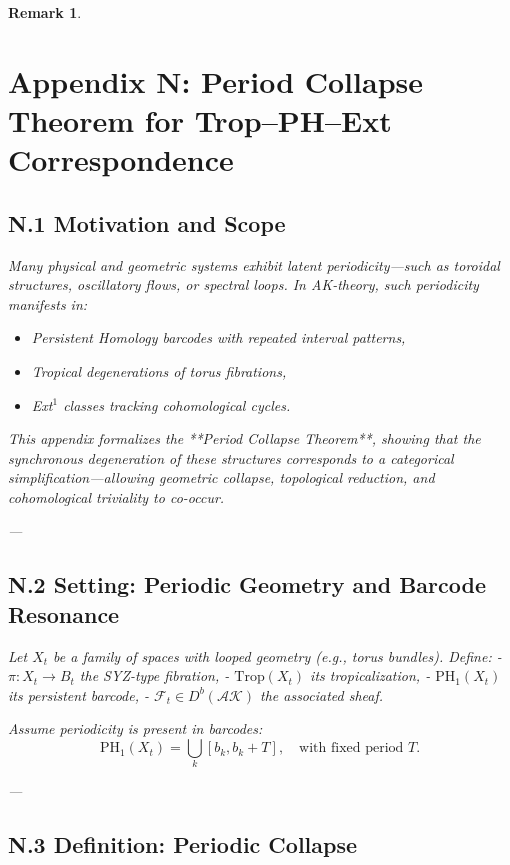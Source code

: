\documentclass[11pt]{article}
\newtheorem{remark}[theorem]{Remark}
\begin{document}
\begin{remark}


\section*{Appendix N: Period Collapse Theorem for Trop–PH–Ext Correspondence}

\subsection*{N.1 Motivation and Scope}

Many physical and geometric systems exhibit latent periodicity—such as toroidal structures, oscillatory flows, or spectral loops. In AK-theory, such periodicity manifests in:
\begin{itemize}
  \item Persistent Homology barcodes with repeated interval patterns,
  \item Tropical degenerations of torus fibrations,
  \item Ext$^1$ classes tracking cohomological cycles.
\end{itemize}

This appendix formalizes the **Period Collapse Theorem**, showing that the synchronous degeneration of these structures corresponds to a categorical simplification—allowing geometric collapse, topological reduction, and cohomological triviality to co-occur.

---

\subsection*{N.2 Setting: Periodic Geometry and Barcode Resonance}

Let $X_t$ be a family of spaces with looped geometry (e.g., torus bundles). Define:
- $\pi: X_t \to B_t$ the SYZ-type fibration,
- $\mathrm{Trop}(X_t)$ its tropicalization,
- $\mathrm{PH}_1(X_t)$ its persistent barcode,
- $\mathcal{F}_t \in D^b(\mathcal{AK})$ the associated sheaf.

Assume periodicity is present in barcodes:
\[
\mathrm{PH}_1(X_t) = \bigcup_{k} [b_k, b_k + T], \quad \text{with fixed period } T.
\]

---

\subsection*{N.3 Definition: Periodic Collapse}


\end{remark}
\end{document}
